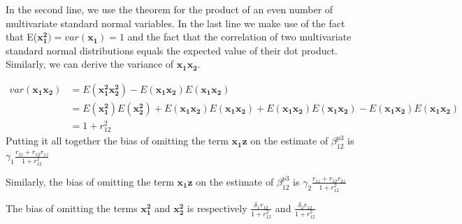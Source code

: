 \documentclass[12pt]{article}
\begin{document}
In the second line, we use the \citet{isserlis_formula_1918} theorem for the product of an even number of multivariate standard normal variables. In the last line we make use of the fact that E($\mathbf{x_1^2}) = var(\mathbf{x_1}) = 1$ and the fact that the correlation of two multivariate standard normal distributions equals the expected value of their dot product. Similarly, we can derive the variance of $\mathbf{x_1 x_2}$. 

\begin{align*}
	var(\mathbf{x_1 x_2}) &= E(\mathbf{x_1^2 x_2^2}) - E(\mathbf{x_1 x_2}) E(\mathbf{x_1 x_2}) \\
	&= E(\mathbf{x^2_1}) E(\mathbf{x^2_2}) +  E(\mathbf{x_1 x_2}) E(\mathbf{x_1 x_2}) + E(\mathbf{x_1 x_2}) E(\mathbf{x_1 x_2}) - E(\mathbf{x_1 x_2}) E(\mathbf{x_1 x_2}) \\
	&= 1 + r^2_{12}
\end{align*}
Putting it all together the bias of omitting the term $\mathbf{x_1 z}$ on the estimate of $\beta^{p3}_{12}$ is  $\gamma_1 \frac{r_{2z} + r_{12} r_{1z}}{1 + r^2_{12}}$

Similarly, the bias of omitting the term $\mathbf{x_1 z}$ on the estimate of $\beta^{p3}_{12}$ is  $\gamma_2 \frac{r_{1z} + r_{12} r_{2z}}{1 + r_{12}^2}$

The bias of omitting the terms $\mathbf{x_1^2}$ and $\mathbf{x_2^2}$ is respectively $\frac{\delta_1 r_{12}}{1 + r_{12}^2}$ and $\frac{\delta_2 r_{12}}{1 + r_{12}^2}$

\newpage
\end{document}
